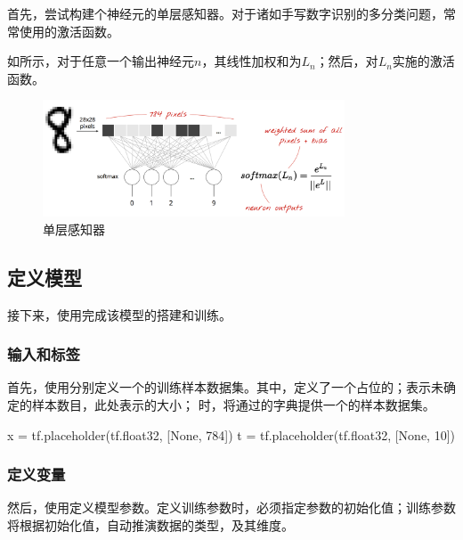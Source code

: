 \begin{content}

首先，尝试构建个神经元的单层感知器。对于诸如手写数字识别的多分类问题，常常使用的激活函数。

如所示，对于任意一个输出神经元$n$，其线性加权和为$L_n$；然后，对$L_n$实施的激活函数。


\begin{figure}[H]
\centering
\includegraphics[width=0.8\textwidth]{figures/mnist-slp.png}
\caption{单层感知器}
 \label{fig:mnist-slp}
\end{figure}

\subsection{定义模型}

接下来，使用\tf{}完成该模型的搭建和训练。

\subsubsection{输入和标签}

首先，使用分别定义一个的训练样本数据集。其中，定义了一个占位的；表示未确定的样本数目，此处表示的大小；
时，将通过的字典提供一个的样本数据集。

\begin{leftbar}
\begin{python}
x = tf.placeholder(tf.float32, [None, 784]) 
t = tf.placeholder(tf.float32, [None, 10])
\end{python}
\end{leftbar}

\subsubsection{定义变量}

然后，使用定义模型参数。定义训练参数时，必须指定参数的初始化值；训练参数将根据初始化值，自动推演数据的类型，及其维度。


\end{content}
